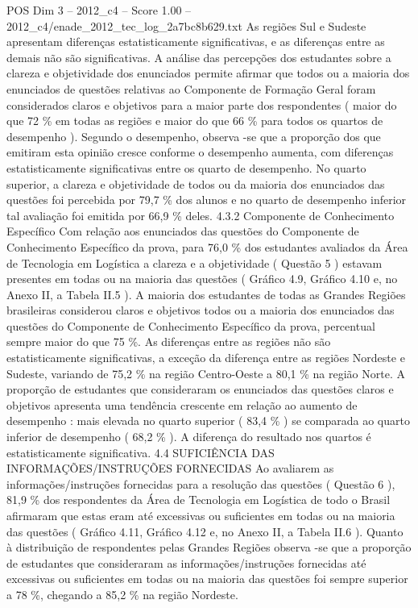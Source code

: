 \begin{textsample}{POS Dim 3 – 2012\_c4 – Score 1.00 – 2012\_c4/enade\_2012\_tec\_log\_2a7bc8b629.txt}
As regiões Sul e Sudeste apresentam diferenças estatisticamente significativas, e as diferenças entre as demais não são significativas.
A análise das percepções dos estudantes sobre a clareza e objetividade dos enunciados permite afirmar que todos ou a maioria dos enunciados de questões relativas ao Componente de Formação Geral foram considerados claros e objetivos para a maior parte dos respondentes ( maior do que 72 \% em todas as regiões e maior do que 66 \% para todos os quartos de desempenho ).
Segundo o desempenho, observa -se que a proporção dos que emitiram esta opinião cresce conforme o desempenho aumenta, com diferenças estatisticamente significativas entre os quarto de desempenho.
No quarto superior, a clareza e objetividade de todos ou da maioria dos enunciados das questões foi percebida por 79,7 \% dos alunos e no quarto de desempenho inferior tal avaliação foi emitida por 66,9 \% deles. 4.3.2 Componente de Conhecimento Específico Com relação aos enunciados das questões do Componente de Conhecimento Específico da prova, para 76,0 \% dos estudantes avaliados da Área de Tecnologia em Logística a clareza e a objetividade ( Questão 5 ) estavam presentes em todas ou na maioria das questões ( Gráfico 4.9, Gráfico 4.10 e, no Anexo II, a Tabela II.5 ).
A maioria dos estudantes de todas as Grandes Regiões brasileiras considerou claros e objetivos todos ou a maioria dos enunciados das questões do Componente de Conhecimento Específico da prova, percentual sempre maior do que 75 \%.
As diferenças entre as regiões não são estatisticamente significativas, a exceção da diferença entre as regiões Nordeste e Sudeste, variando de 75,2 \% na região Centro-Oeste a 80,1 \% na região Norte.
A proporção de estudantes que consideraram os enunciados das questões claros e objetivos apresenta uma tendência crescente em relação ao aumento de desempenho : mais elevada no quarto superior ( 83,4 \% ) se comparada ao quarto inferior de desempenho ( 68,2 \% ).
A diferença do resultado nos quartos é estatisticamente significativa. 4.4 SUFICIÊNCIA DAS INFORMAÇÕES/INSTRUÇÕES FORNECIDAS Ao avaliarem as informações/instruções fornecidas para a resolução das questões ( Questão 6 ), 81,9 \% dos respondentes da Área de Tecnologia em Logística de todo o Brasil afirmaram que estas eram até excessivas ou suficientes em todas ou na maioria das questões ( Gráfico 4.11, Gráfico 4.12 e, no Anexo II, a Tabela II.6 ).
Quanto à distribuição de respondentes pelas Grandes Regiões observa -se que a proporção de estudantes que consideraram as informações/instruções fornecidas até excessivas ou suficientes em todas ou na maioria das questões foi sempre superior a 78 \%, chegando a 85,2 \% na região Nordeste.

\end{textsample}
